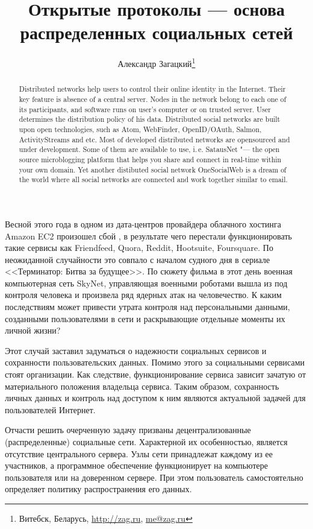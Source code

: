 \documentclass[10pt, a5paper]{article}
\begin{document}
\title{Открытые протоколы --- основа распределенных социальных сетей}
\author{Александр Загацкий\footnote{Витебск, Беларусь, \url{http://zag.ru}, \url{me@zag.ru}}}
\date{}
\maketitle

\begin{abstract}Distributed networks help users to control their online iden\-ti\-ty in the Internet.
Their key feature is absence of a central server. Nodes
in the network belong to each one of its
participants, and software runs on user's computer
or on trusted server. User determines the distribution policy
of his data.
Distributed social networks are built upon open technologies, such as Atom,
Web\-Finder, OpenID/OAuth, Salmon, ActivityStreams and etc.
Most of de\-ve\-loped distributed networks are opensourced and under
development. Some of them are available to use, i.\,e. 
SatausNet "--- the open source microblogging platform that
helps you share and connect in real-time within your own domain. Yet
another distibuted social network OneSocialWeb is a dream of the world where
all social networks are connected and work together similar
to email.
\end{abstract}
Весной этого года в одном из дата-центров провайдера облачного хостинга
Amazon EC2 произошел сбой \cite{zag1}, в результате чего перестали
 функционировать такие сервисы как Friendfeed, Quora, Reddit, Hootsuite,
 Foursquare. По неожиданной случайности это совпало с началом судного дня
 в сериале <<Терминатор: Битва за будущее>>. По сюжету фильма в этот день
 военная компьютерная сеть SkyNet, управляющая военными роботами вышла из
 под контроля человека и произвела ряд ядерных атак на человечество. К
 каким последствиям может привести утрата контроля над персональными
 данными, созданными пользователями в сети и раскрывающие отдельные
 моменты их личной жизни?

 Этот случай заставил задуматься о надежности социальных сервисов и
 сохранности пользовательских данных. Помимо этого за социальными
 сервисами стоят организации. Как следствие, функционирование сервиса
 зависит зачатую от материального положения владельца сервиса. Таким
 образом, сохранность личных данных и контроль над доступом к ним являются
 актуальной задачей для пользователей Интернет.

 Отчасти решить очерченную задачу призваны децентрализованные
 (распределенные) социальные сети. Характерной их особенностью, является
 отсутствие центрального сервера. Узлы сети принадлежат каждому из ее
 участников, а программное обеспечение функционирует на компьютере
 пользователя или на доверенном сервере. При этом пользователь
 самостоятельно определяет политику распространения его данных.
\end{document}
